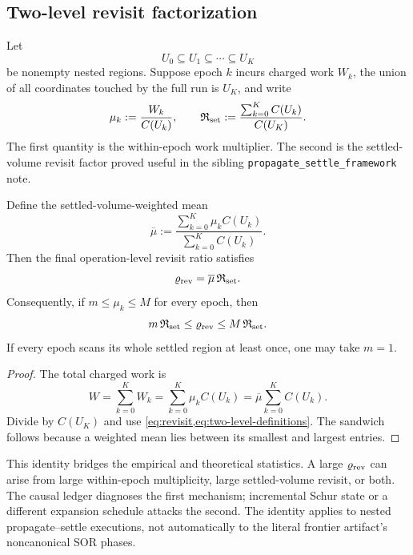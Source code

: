 \subsection{Two-level revisit factorization}

Let
\[
 U_0\subseteq U_1\subseteq\cdots\subseteq U_K
\]
be nonempty nested regions.  Suppose epoch $k$ incurs charged work $W_k$,
the union of all coordinates touched by the full run is $U_K$, and write
\begin{equation}
 \mu_k:=\frac{W_k}{C(U_k)},
 \qquad
 \mathfrak R_{\rm set}
 :=\frac{\sum_{k=0}^K C(U_k)}{C(U_K)}.
 \label{eq:two-level-definitions}
\end{equation}
The first quantity is the within-epoch work multiplier.  The second is the
settled-volume revisit factor proved useful in the sibling
\texttt{propagate\_settle\_framework} note.

\begin{theorem}
\label{thm:two-level-factorization}
Define the settled-volume-weighted mean
\begin{equation}
 \overline\mu:=
 \frac{\sum_{k=0}^K\mu_kC(U_k)}
      {\sum_{k=0}^K C(U_k)}.
 \label{eq:mean-local-multiplier}
\end{equation}
Then the final operation-level revisit ratio satisfies
\begin{equation}
 \varrho_{\rm rev}
 =\overline\mu\,\mathfrak R_{\rm set}.
 \label{eq:two-level-factorization}
\end{equation}
Consequently, if $m\leq\mu_k\leq M$ for every epoch, then
\begin{equation}
 m\,\mathfrak R_{\rm set}
 \leq\varrho_{\rm rev}
 \leq M\,\mathfrak R_{\rm set}.
 \label{eq:factorization-sandwich}
\end{equation}
If every epoch scans its whole settled region at least once, one may take
$m=1$.
\end{theorem}

\begin{proof}
The total charged work is
\[
 W=\sum_{k=0}^K W_k
  =\sum_{k=0}^K\mu_kC(U_k)
  =\overline\mu\sum_{k=0}^K C(U_k).
\]
Divide by $C(U_K)$ and use
\cref{eq:revisit,eq:two-level-definitions}.  The sandwich follows because a
weighted mean lies between its smallest and largest entries.
\end{proof}

This identity bridges the empirical and theoretical statistics.  A large
$\varrho_{\rm rev}$ can arise from large within-epoch multiplicity, large
settled-volume revisit, or both.  The causal ledger diagnoses the first
mechanism; incremental Schur state or a different expansion schedule attacks
the second.  The identity applies to nested propagate--settle executions, not
automatically to the literal frontier artifact's noncanonical SOR phases.
